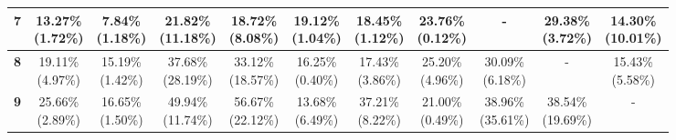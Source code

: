 \documentclass{report}
\begin{document}
\begin{center}
{\begin{tabular}{|c|c|c|c|c|c|c|c|c|c|c|}
\textbf{7} & \makecell{13.27\% \\ (1.72\%)} & \makecell{7.84\% \\ (1.18\%)} & \makecell{21.82\% \\ (11.18\%)} & \makecell{18.72\% \\ (8.08\%)} & \makecell{19.12\% \\ (1.04\%)} & \makecell{18.45\% \\ (1.12\%)} & \makecell{23.76\% \\ (0.12\%)} & - & \makecell{29.38\% \\ (3.72\%)} & \makecell{14.30\% \\ (10.01\%)} \\ \hline
\textbf{8} & \makecell{19.11\% \\ (4.97\%)} & \makecell{15.19\% \\ (1.42\%)} & \makecell{37.68\% \\ (28.19\%)} & \makecell{33.12\% \\ (18.57\%)} & \makecell{16.25\% \\ (0.40\%)} & \makecell{17.43\% \\ (3.86\%)} & \makecell{25.20\% \\ (4.96\%)} & \makecell{30.09\% \\ (6.18\%)} & - & \makecell{15.43\% \\ (5.58\%)} \\ \hline
\textbf{9} & \makecell{25.66\% \\ (2.89\%)} & \makecell{16.65\% \\ (1.50\%)} & \makecell{49.94\% \\ (11.74\%)} & \makecell{56.67\% \\ (22.12\%)} & \makecell{13.68\% \\ (6.49\%)} & \makecell{37.21\% \\ (8.22\%)} & \makecell{21.00\% \\ (0.49\%)} & \makecell{38.96\% \\ (35.61\%)} & \makecell{38.54\% \\ (19.69\%)} & - \\ \hline
  \end{tabular}
}
\end{center}


\newpage

{}
\end{document}
